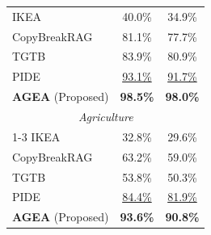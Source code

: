 \begin{table}[!t]
\begin{minipage}{0.49\textwidth}
{\begin{tabular}{lcc}
IKEA \cite{wang2025silent} & 40.0\% & 34.9\% \\
CopyBreakRAG \cite{jiang2025feedback} & 81.1\% & 77.7\% \\
TGTB \cite{zeng2024good} & 83.9\% & 80.9\% \\
PIDE \cite{qifollow} & \underline{93.1\%} & \underline{91.7\%} \\
\textbf{AGEA} (Proposed) & \textbf{98.5\%} & \textbf{98.0\%} \\
\midrule
\multicolumn{3}{c}{\textit{Agriculture}} \\
\cmidrule(lr){1-3}
IKEA \cite{wang2025silent} & 32.8\% & 29.6\% \\
CopyBreakRAG \cite{jiang2025feedback} & 63.2\% & 59.0\% \\
TGTB \cite{zeng2024good} & 53.8\% & 50.3\% \\
PIDE \cite{qifollow} & \underline{84.4\%} & \underline{81.9\%} \\
\textbf{AGEA} (Proposed) & \textbf{93.6\%} & \textbf{90.8\%} \\
\bottomrule
\end{tabular}%
}
\end{minipage}
\end{table}








